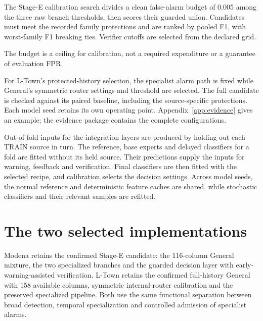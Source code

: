 The Stage-E calibration search divides a clean false-alarm budget of 0.005 among the three raw branch thresholds, then scores their guarded union. Candidates must meet the recorded family protections and are ranked by pooled F1, with worst-family F1 breaking ties. Verifier cutoffs are selected from the declared grid.

The budget is a ceiling for calibration, not a required expenditure or a guarantee of evaluation FPR.

For L-Town's protected-history selection, the specialist alarm path is fixed while General's symmetric router settings and threshold are selected. The full candidate is checked against its paired baseline, including the source-specific protections. Each model seed retains its own operating point. Appendix~\ref{app:evidence} gives an example; the evidence package contains the complete configurations.

Out-of-fold inputs for the integration layers are produced by holding out each TRAIN source in turn. The reference, base experts and delayed classifiers for a fold are fitted without its held source. Their predictions supply the inputs for warning, feedback and verification. Final classifiers are then fitted with the selected recipe, and calibration selects the decision settings. Across model seeds, the normal reference and deterministic feature caches are shared, while stochastic classifiers and their relevant samples are refitted.

\section{The two selected implementations}
Modena retains the confirmed Stage-E candidate: the 116-column General mixture, the two specialized branches and the guarded decision layer with early-warning-assisted verification. L-Town retains the confirmed full-history General with 158 available columns, symmetric internal-router calibration and the preserved specialized pipeline. Both use the same functional separation between broad detection, temporal specialization and controlled admission of specialist alarms.

